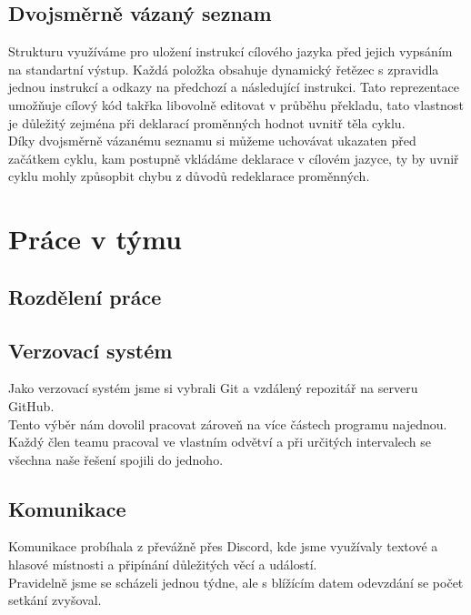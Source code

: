 \documentclass[11pt]{article}
\begin{document}
    \subsection{Dvojsměrně vázaný seznam}
        Strukturu využíváme pro uložení instrukcí cílového jazyka před jejich vypsáním na standartní výstup. Každá položka obsahuje dynamický řetězec s zpravidla jednou instrukcí a odkazy na předchozí a následující instrukci. Tato reprezentace umožňuje cílový kód takřka libovolně editovat v průběhu překladu, tato vlastnost je důležitý zejména při deklarací proměnných hodnot uvnitř těla cyklu. \\
        \indent Díky dvojsměrně vázanému seznamu si můžeme uchovávat ukazaten před začátkem cyklu, kam postupně vkládáme deklarace v cílovém jazyce, ty by uvniř cyklu mohly způsopbit chybu z důvodů redeklarace proměnných.
        
    
    \section{Práce v týmu}
    
    \subsection{Rozdělení práce}
    
    \subsection{Verzovací systém}
        Jako verzovací systém jsme si vybrali Git a vzdálený repozitář na serveru GitHub. \\
    	\indent Tento výběr nám dovolil pracovat zároveň na více částech programu najednou. Každý člen teamu pracoval ve vlastním odvětví a při určitých intervalech se všechna naše řešení spojili do jednoho. 

    \subsection{Komunikace}
        Komunikace probíhala z převážně přes Discord, kde jsme využívaly textové a hlasové místnosti a připínání důležitých věcí a událostí. \\
    	\indent Pravidelně jsme se scházeli jednou týdne, ale s blížícím datem odevzdání se počet setkání zvyšoval.
\end{document}
